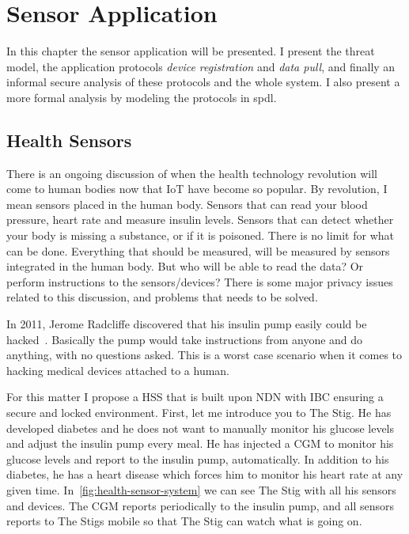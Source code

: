 \chapter{Sensor Application}\label{sensor-application}
In this chapter the sensor application will be presented. 
I present the threat model, the application protocols \textit{device registration} and \textit{data pull}, and finally an informal secure analysis of these protocols and the whole system. 
I also present a more formal analysis by modeling the protocols in \gls{spdl}.

\section{Health Sensors}
There is an ongoing discussion of when the health technology revolution will come to human bodies now that \gls{IoT} have become so popular.
By revolution, I mean sensors placed in the human body. 
Sensors that can read your blood pressure, heart rate and measure insulin levels.
Sensors that can detect whether your body is missing a substance, or if it is poisoned. 
There is no limit for what can be done.
Everything that should be measured, will be measured by sensors integrated in the human body.
But who will be able to read the data?
Or perform instructions to the sensors/devices?
There is some major privacy issues related to this discussion, and problems that needs to be solved.

In 2011, Jerome Radcliffe discovered that his insulin pump easily could be hacked~\cite{radcliffe2011hacking}.
Basically the pump would take instructions from anyone and do anything, with no questions asked. 
This is a worst case scenario when it comes to hacking medical devices attached to a human.

For this matter I propose a \gls{HSS} that is built upon \gls{NDN} with \gls{IBC} ensuring a secure and locked environment.
First, let me introduce you to The Stig. 
He has developed diabetes and he does not want to manually monitor his glucose levels and adjust the insulin pump every meal. 
He has injected a \gls{CGM} to monitor his glucose levels and report to the insulin pump, automatically.
In addition to his diabetes, he has a heart disease which forces him to monitor his heart rate at any given time. 
In~\autoref{fig:health-sensor-system} we can see The Stig with all his sensors and devices. 
The \gls{CGM} reports periodically to the insulin pump, and all sensors reports to The Stigs mobile so that The Stig can watch what is going on.

